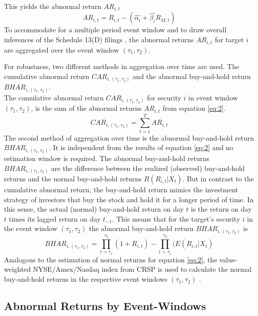 \documentclass[12pt]{article}
\begin{document}
This yields the abnormal return $AR_{i,t}$
	\begin{equation}\label{eq:2}
		AR_{i,t}=R_{i,t}-(\hat{\alpha_{i}}+\hat{\beta_{i}}R_{M,t})
	\end{equation}
To accommodate for a multiple period event window and to draw overall inferences of the Schedule 13(D) filings \citep[p.21]{MacKinlay1997}, the abnormal returns $AR_{i,t}$ for target $i$ are aggregated over the event window $(\tau_1,\tau_2)$. 

For robustness, two different methods in aggregation over time are used. The cumulative abnormal return $CAR_{i,(\tau_1,\tau_2)}$ and the abnormal buy-and-hold return $BHAR_{i,(\tau_1,\tau_2)}$.\\
The cumulative abnormal return $CAR_{i,(\tau_1,\tau_2)}$ for security $i$ in event window $(\tau_1,\tau_2)$, is the sum of the abnormal returns $AR_{i,t}$ from equation \eqref{eq:2}.
	\begin{equation}
		CAR_{i,(\tau_1,\tau_2)}=\sum_{t=1}^{T}AR_{i,t}
	\end{equation}
The second method of aggregation over time is the abnormal buy-and-hold return $BHAR_{i,(\tau_1,\tau_2)}$. It is independent from the results of equation \eqref{eq:2} and no estimation window is required. 
The abnormal buy-and-hold returns $BHAR_{i,(\tau_1,\tau_2)}$ are the difference between the realized (observed) buy-and-hold returns and the normal buy-and-hold returns $R(R_{i,t}|X_{t})$.
But in contrast to the cumulative abnormal return, the buy-and-hold return mimics the investment strategy of investors that buy the stock and hold it for a longer period of time. In this sense, the actual (normal) buy-and-hold return on day $t$ is the return on day $t$ times its lagged return on day $t_{-1}$. This means that for the target's security $i$ in the event window $(\tau_1,\tau_2)$ the abnormal buy-and-hold return $BHAR_{i,(\tau_1,\tau_2)}$ is
\begin{equation}
	BHAR_{i,(\tau_1,\tau_2)}=\prod_{t=\tau_1}^{\tau_2}(1+R_{i,t})-\prod_{t=\tau_1}^{\tau_2}(E(R_{i,t}|X_{t})
\end{equation}
Analogous to the estimation of normal returns for equation \eqref{eq:2}, the value-weighted NYSE/Amex/Nasdaq index from CRSP is used to calculate the normal buy-and-hold returns in the respective event windows $(\tau_1,\tau_2)$ \citep[p.25]{Brav2009}.

\subsection{Abnormal Returns by Event-Windows}
\end{document}
